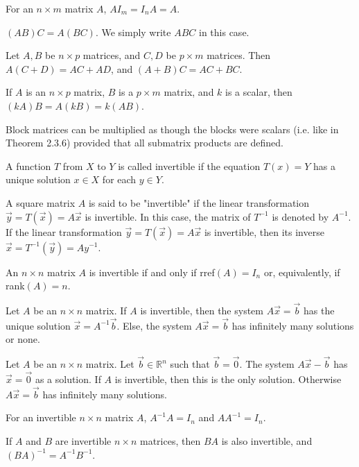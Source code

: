 \documentclass[a4paper,11pt]{article}
\begin{document}
\begin{outline}
    For an \(n \times m\) matrix \(A\), \(AI_m = I_nA = A\).
    
    \((AB)C = A(BC)\). We simply write \(ABC\) in this case.
    
    Let \(A, B\) be \(n \times p\) matrices, and \(C,D\) be \(p \times m\) matrices. Then \(A(C + D) = AC + AD\),
    and \((A + B)C = AC + BC\).
    
    If \(A\) is an \(n \times p\) matrix, \(B\) is a \(p \times m\) matrix, and \(k\) is a scalar, then \((kA)B =
    A(kB) = k(AB)\).
    
    Block matrices can be multiplied as though the blocks were scalars (i.e. like in Theorem 2.3.6) provided 
    that all submatrix products are defined.
    
    A function \(T\) from \(X\) to \(Y\) is called invertible if the equation \(T(x) = Y\) has a unique solution
    \(x \in X\) for each \(y \in Y\).
    
    A square matrix \(A\) is said to be "invertible" if the linear transformation \(\vec{y} = T(\vec{x}) = A\vec{x}\)
    is invertible. In this case, the matrix of \(T^{-1}\) is denoted by \(A^{-1}\). If the linear transformation 
    \(\vec{y} = T(\vec{x}) = A\vec{x}\) is invertible, then its inverse \(\vec{x} = T^{-1}(\vec{y}) = Ay^{-1}\).
    
    An \(n \times n\) matrix \(A\) is invertible if and only if rref\((A) = I_n\) or, equivalently, if 
    rank\((A) = n\).
    
    Let \(A\) be an \(n \times n\) matrix. If \(A\) is invertible, then the system \(A\vec{x}=\vec{b}\) has
    the unique solution \(\vec{x} = A^{-1}\vec{b}\). Else, the system \(A\vec{x} = \vec{b}\) has infinitely
    many solutions or none.
    
    Let \(A\) be an \(n \times n\) matrix. Let \(\vec{b} \in \mathbb{R}^n\) such that \(\vec{b} = \vec{0}\).
    The system \(A\vec{x} - \vec{b}\) has \(\vec{x} = \vec{0}\) as a solution. If \(A\) is invertible, then
    this is the only solution. Otherwise \(A\vec{x} = \vec{b}\) has infinitely many solutions.
    
    For an invertible \(n \times n\) matrix \(A\), \(A^{-1}A = I_n\) and \(AA^{-1} = I_n\).
    
    If \(A\) and \(B\) are invertible \(n \times n\) matrices, then \(BA\) is also invertible, and
    \((BA)^{-1} = A^{-1}B^{-1}\).
    

\end{outline}
\end{document}
